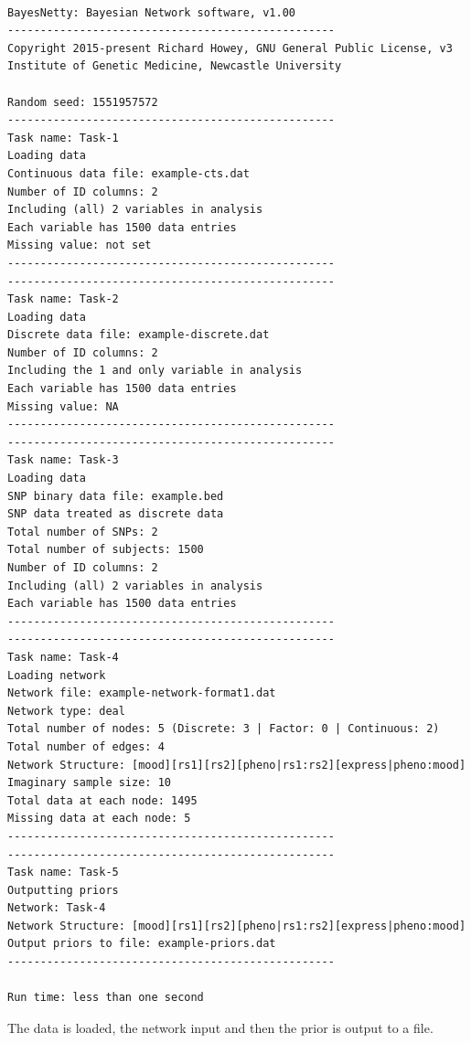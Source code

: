 \documentclass[a4paper,12pt]{article}
\begin{document}
\vspace{0.35cm} \begin{lstlisting}

BayesNetty: Bayesian Network software, v1.00
--------------------------------------------------
Copyright 2015-present Richard Howey, GNU General Public License, v3
Institute of Genetic Medicine, Newcastle University

Random seed: 1551957572
--------------------------------------------------
Task name: Task-1
Loading data
Continuous data file: example-cts.dat
Number of ID columns: 2
Including (all) 2 variables in analysis
Each variable has 1500 data entries
Missing value: not set
--------------------------------------------------
--------------------------------------------------
Task name: Task-2
Loading data
Discrete data file: example-discrete.dat
Number of ID columns: 2
Including the 1 and only variable in analysis
Each variable has 1500 data entries
Missing value: NA
--------------------------------------------------
--------------------------------------------------
Task name: Task-3
Loading data
SNP binary data file: example.bed
SNP data treated as discrete data
Total number of SNPs: 2
Total number of subjects: 1500
Number of ID columns: 2
Including (all) 2 variables in analysis
Each variable has 1500 data entries
--------------------------------------------------
--------------------------------------------------
Task name: Task-4
Loading network
Network file: example-network-format1.dat
Network type: deal
Total number of nodes: 5 (Discrete: 3 | Factor: 0 | Continuous: 2)
Total number of edges: 4
Network Structure: [mood][rs1][rs2][pheno|rs1:rs2][express|pheno:mood]
Imaginary sample size: 10
Total data at each node: 1495
Missing data at each node: 5
--------------------------------------------------
--------------------------------------------------
Task name: Task-5
Outputting priors
Network: Task-4
Network Structure: [mood][rs1][rs2][pheno|rs1:rs2][express|pheno:mood]
Output priors to file: example-priors.dat
--------------------------------------------------

Run time: less than one second

\end{lstlisting} \vspace{0.35cm}
The data is loaded, the network input and then the prior is output to a file. 



\end{document}
